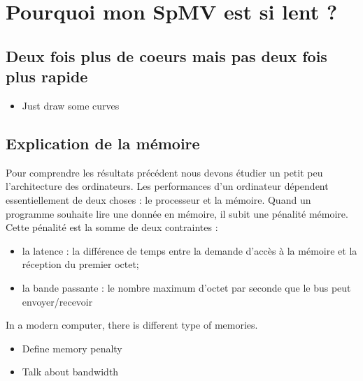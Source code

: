 \section{Pourquoi mon SpMV est si lent ?}
\subsection{Deux fois plus de coeurs mais pas deux fois plus rapide}
  \begin{itemize}
    \item Just draw some curves
  \end{itemize}
\subsection{Explication de la mémoire}
Pour comprendre les résultats précédent nous devons étudier un petit peu l'architecture des ordinateurs.
%
Les performances d'un ordinateur dépendent essentiellement de deux choses : le processeur et la mémoire.
%
Quand un programme souhaite lire une donnée en mémoire, il subit une pénalité mémoire.
%
Cette pénalité est la somme de deux contraintes :
\begin{itemize}
        \item la latence : la différence de temps entre la demande d'accès à la mémoire et la réception du premier octet;
        \item la bande passante : le nombre maximum d'octet par seconde que le bus peut envoyer/recevoir
\end{itemize}
%
In a modern computer, there is different type of memories.
%




  \begin{itemize}
    \item Define memory penalty
    \item Talk about bandwidth
  \end{itemize}
